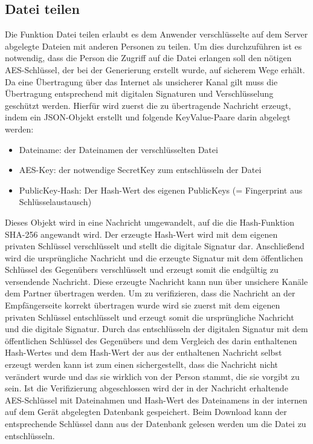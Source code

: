 \documentclass[10pt, a4paper]{scrreprt}
\begin{document}
\subsection{Datei teilen}
Die Funktion Datei teilen erlaubt es dem Anwender verschlüsselte auf dem Server abgelegte Dateien mit anderen Personen zu teilen. Um dies durchzuführen ist es notwendig, dass die Person die Zugriff auf die Datei erlangen soll den nötigen AES-Schlüssel, der bei der Generierung erstellt wurde, auf sicherem Wege erhält. Da eine Übertragung über das Internet als unsicherer Kanal gilt muss die Übertragung entsprechend mit digitalen Signaturen und Verschlüsselung geschützt werden. Hierfür wird zuerst die zu übertragende Nachricht erzeugt, indem ein JSON-Objekt erstellt und folgende KeyValue-Paare darin abgelegt werden:
\begin{itemize}
\item Dateiname: der Dateinamen der verschlüsselten Datei
\item AES-Key: der notwendige SecretKey zum entschlüsseln der Datei
\item PublicKey-Hash: Der Hash-Wert des eigenen PublicKeys (= Fingerprint aus Schlüsselaustausch)
\end{itemize}
Dieses Objekt wird in eine Nachricht umgewandelt, auf die die Hash-Funktion SHA-256 angewandt wird. Der erzeugte Hash-Wert wird mit dem eigenen privaten Schlüssel verschlüsselt und stellt die digitale Signatur dar. Anschließend wird die ursprüngliche Nachricht und die erzeugte Signatur mit dem öffentlichen Schlüssel des Gegenübers verschlüsselt und erzeugt somit die endgültig zu versendende Nachricht.
Diese erzeugte Nachricht kann nun über unsichere Kanäle dem Partner übertragen werden. Um zu verifizieren, dass die Nachricht an der Empfängerseite korrekt übertragen wurde wird sie zuerst mit dem eigenen privaten Schlüssel entschlüsselt und erzeugt somit die ursprüngliche Nachricht und die digitale Signatur. Durch das entschlüsseln der digitalen Signatur mit dem öffentlichen Schlüssel des Gegenübers und dem Vergleich des darin enthaltenen Hash-Wertes und dem Hash-Wert der aus der enthaltenen Nachricht selbst erzeugt werden kann ist zum einen sichergestellt, dass die Nachricht nicht verändert wurde und das sie wirklich von der Person stammt, die sie vorgibt zu sein. Ist die Verifizierung abgeschlossen wird der in der Nachricht erhaltende AES-Schlüssel mit Dateinahmen und Hash-Wert des Dateinamens in der internen auf dem Gerät abgelegten Datenbank gespeichert. Beim Download kann der entsprechende Schlüssel dann aus der Datenbank gelesen werden um die Datei zu entschlüsseln.
\end{document}

